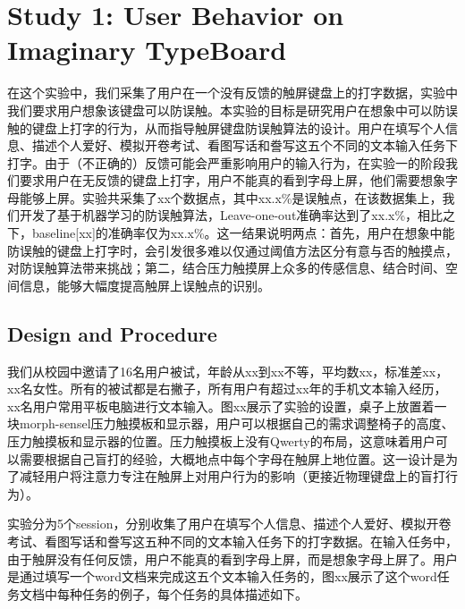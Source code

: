 \section{Study 1: User Behavior on Imaginary TypeBoard}

在这个实验中，我们采集了用户在一个没有反馈的触屏键盘上的打字数据，实验中我们要求用户想象该键盘可以防误触。本实验的目标是研究用户在想象中可以防误触的键盘上打字的行为，从而指导触屏键盘防误触算法的设计。用户在填写个人信息、描述个人爱好、模拟开卷考试、看图写话和誊写这五个不同的文本输入任务下打字。由于（不正确的）反馈可能会严重影响用户的输入行为，在实验一的阶段我们要求用户在无反馈的键盘上打字，用户不能真的看到字母上屏，他们需要想象字母能够上屏。实验共采集了xx个数据点，其中xx.x\%是误触点，在该数据集上，我们开发了基于机器学习的防误触算法，Leave-one-out准确率达到了xx.x\%，相比之下，baseline[xx]的准确率仅为xx.x\%。这一结果说明两点：首先，用户在想象中能防误触的键盘上打字时，会引发很多难以仅通过阈值方法区分有意与否的触摸点，对防误触算法带来挑战；第二，结合压力触摸屏上众多的传感信息、结合时间、空间信息，能够大幅度提高触屏上误触点的识别。

\subsection{Design and Procedure}

我们从校园中邀请了16名用户被试，年龄从xx到xx不等，平均数xx，标准差xx，xx名女性。所有的被试都是右撇子，所有用户有超过xx年的手机文本输入经历，xx名用户常用平板电脑进行文本输入。图xx展示了实验的设置，桌子上放置着一块morph-sensel压力触摸板和显示器，用户可以根据自己的需求调整椅子的高度、压力触摸板和显示器的位置。压力触摸板上没有Qwerty的布局，这意味着用户可以需要根据自己盲打的经验，大概地点中每个字母在触屏上地位置。这一设计是为了减轻用户将注意力专注在触屏上对用户行为的影响（更接近物理键盘上的盲打行为）。

实验分为5个session，分别收集了用户在填写个人信息、描述个人爱好、模拟开卷考试、看图写话和誊写这五种不同的文本输入任务下的打字数据。在输入任务中，由于触屏没有任何反馈，用户不能真的看到字母上屏，而是想象字母上屏了。用户是通过填写一个word文档来完成这五个文本输入任务的，图xx展示了这个word任务文档中每种任务的例子，每个任务的具体描述如下。

